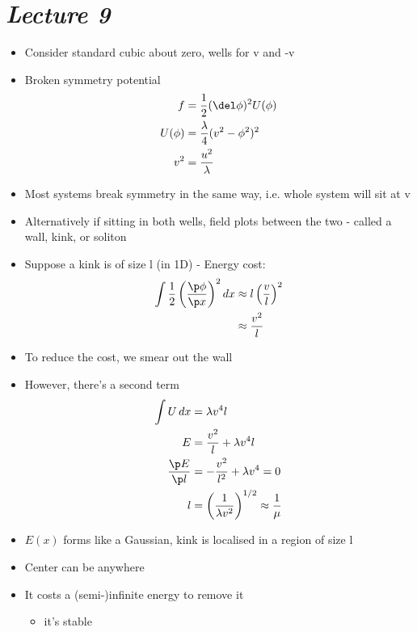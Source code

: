 \documentclass[a4paper, 11pt, normalem]{report}
\begin{document}
\chapter{\textit{Lecture 9}}
\begin{itemize}
    \item Consider standard cubic about zero, wells for v and -v
    \item Broken symmetry potential
        \begin{align}
            f &= \frac12(\del\phi)^2 U(\phi) \\
            U(\phi) &= \frac{\lambda}{4}(v^2 - \phi^2)^2 \\
            v^2 &= \frac{u^2}{\lambda}
        \end{align}
    \item Most systems break symmetry in the same way, i.e. whole system will sit at v
    \item Alternatively if sitting in both wells, field plots between the two - called a wall, kink, or soliton
    \item Suppose a kink is of size l (in 1D) - Energy cost:
        \begin{align}
            \int \frac12 \left(\frac{\p\phi}{\p x}\right)^2dx &\approx l\left(\frac{v}{l}\right)^2 \\
                                                                &\approx \frac{v^2}{l}
        \end{align}
    \item To reduce the cost, we smear out the wall
    \item However, there's a second term
        \begin{align}
            \int U\,dx &= \lambda v^4l \\
            E &= \frac{v^2}{l} + \lambda v^4l \\
            \frac{\p E}{\p l} &= -\frac{v^2}{l^2} + \lambda v^4 = 0 \\
            l &= \left(\frac{1}{\lambda v^2}\right)^{1/2} \approx \frac{1}{\mu}
        \end{align}
    \item $E(x)$ forms like a Gaussian, kink is localised in a region of size l
    \item Center can be anywhere
    \item It costs a (semi-)infinite energy to remove it
        \begin{itemize}
            \item it's stable
        \end{itemize}

\end{itemize}
\end{document}
